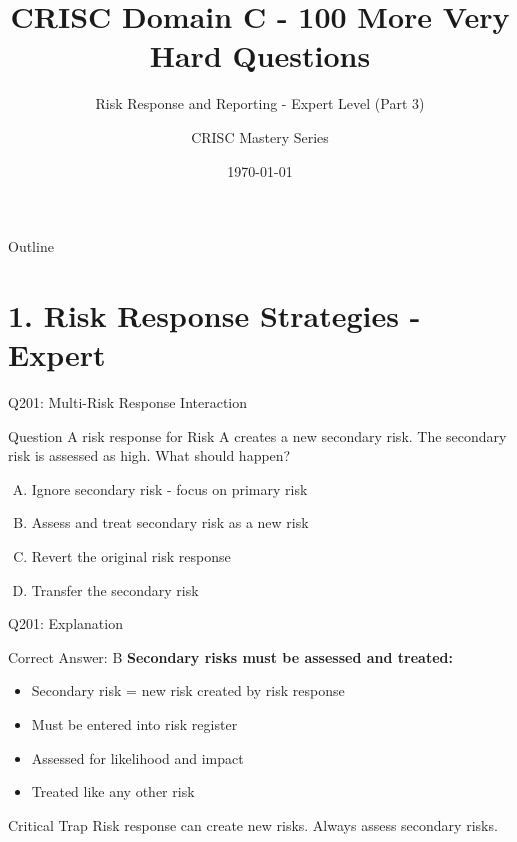 \documentclass{beamer}
\title{CRISC Domain C - 100 More Very Hard Questions}
\subtitle{Risk Response and Reporting - Expert Level (Part 3)}
\author{CRISC Mastery Series}
\date{\today}
\begin{document}
	
	\begin{frame}
		\titlepage
	\end{frame}
	
	\begin{frame}{Outline}
		\tableofcontents
	\end{frame}
	
	
	\section{1. Risk Response Strategies - Expert}
	
	\begin{frame}{Q201: Multi-Risk Response Interaction}
		\begin{block}{Question}
			A risk response for Risk A creates a new secondary risk. The secondary risk is assessed as high. What should happen?
		\end{block}
		\begin{enumerate}[(A)]
			\item Ignore secondary risk - focus on primary risk
			\item Assess and treat secondary risk as a new risk
			\item Revert the original risk response
			\item Transfer the secondary risk
		\end{enumerate}
	\end{frame}
	
	\begin{frame}{Q201: Explanation}
		\begin{block}{Correct Answer: B}
			\textbf{Secondary risks must be assessed and treated:}
			\begin{itemize}
				\item Secondary risk = new risk created by risk response
				\item Must be entered into risk register
				\item Assessed for likelihood and impact
				\item Treated like any other risk
			\end{itemize}
		\end{block}
		\begin{alertblock}{Critical Trap}
			Risk response can create new risks.
			Always assess secondary risks.
		\end{alertblock}
	\end{frame}
	
\end{document}
